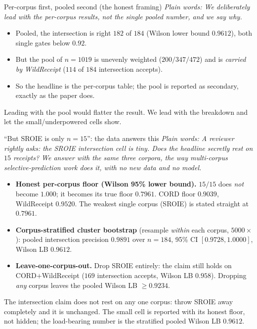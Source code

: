 \documentclass[aspectratio=169]{beamer}
\newcommand{\pcPoolPrec}{0.9891}
\newcommand{\pcPoolN}{184}
\newcommand{\pcPoolWilson}{0.9612}
\newcommand{\pcBootLo}{0.9728}
\newcommand{\pcBootHi}{1.0000}
\newcommand{\pcWeakCorpus}{SROIE}
\newcommand{\pcWeakWilson}{0.7961}
\newcommand{\pcLooMinWilson}{0.9234}
\newcommand{\pcCordWilson}{0.9039}
\newcommand{\pcSroieWilson}{0.7961}
\newcommand{\pcWrWilson}{0.9520}
\newcommand{\poolN}{1019}
\newcommand{\poolIntA}{184}
\newcommand{\poolIntC}{182}
\newcommand{\wrIntA}{114}
\newcommand{\rgPoolWil}{0.9612}
\newcommand{\keybox}[1]{\begin{center}\colorbox{grey!15}{\parbox{0.92\linewidth}{\centering #1}}\end{center}}
\newcommand{\plain}[1]{\textit{\textcolor{sig}{Plain words:} #1}}
\begin{document}
\begin{frame}{Per-corpus first, pooled second (the honest framing)}
\plain{We deliberately lead with the \emph{per-corpus} results, not the
single pooled number, and we say why.}
\begin{itemize}
\item Pooled, the intersection is right $\poolIntC$ of $\poolIntA$
(Wilson lower bound \textcolor{ok}{$\rgPoolWil$}), both single gates
below $0.92$.
\item But the pool of $n{=}\poolN$ is unevenly weighted
($200/347/472$) and is \emph{carried by WildReceipt}
($\wrIntA$ of $\poolIntA$ intersection accepts).
\item So the headline is the per-corpus table; the pool is reported as
secondary, exactly as the paper does.
\end{itemize}
\keybox{Leading with the pool would flatter the result. We lead with the
breakdown and let the small/underpowered cells show.}
\end{frame}

\begin{frame}{``But SROIE is only $n{=}15$'': the data answers this}
\plain{A reviewer rightly asks: the SROIE intersection cell is tiny.
Does the headline secretly rest on $15$ receipts? We answer with the
same three corpora, the way multi-corpus selective-prediction work
does it, with no new data and no model.}
\vspace{0.5em}
\begin{itemize}
\item \textbf{Honest per-corpus floor (Wilson 95\% lower bound).}
$15/15$ does \emph{not} become $1.000$; it becomes its true floor
\textcolor{sig}{$\pcSroieWilson$}. CORD floor $\pcCordWilson$,
WildReceipt $\pcWrWilson$. The weakest single corpus
(\pcWeakCorpus) is stated straight at $\pcWeakWilson$.
\item \textbf{Corpus-stratified cluster bootstrap} (resample
\emph{within} each corpus, $5000\times$): pooled intersection
precision \textcolor{ok}{$\pcPoolPrec$} over $n{=}\pcPoolN$, 95\% CI
$[\pcBootLo,\pcBootHi]$, Wilson LB $\pcPoolWilson$.
\item \textbf{Leave-one-corpus-out.} Drop SROIE entirely: the claim
still holds on CORD$+$WildReceipt ($169$ intersection accepts, Wilson
LB $0.958$). Dropping \emph{any} corpus leaves the pooled Wilson LB
$\ge\pcLooMinWilson$.
\end{itemize}
\keybox{The intersection claim does not rest on any one corpus:
throw SROIE away completely and it is unchanged. The small cell is
reported with its honest floor, not hidden; the load-bearing number
is the stratified pooled Wilson LB $\pcPoolWilson$.}
\end{frame}
\end{document}
